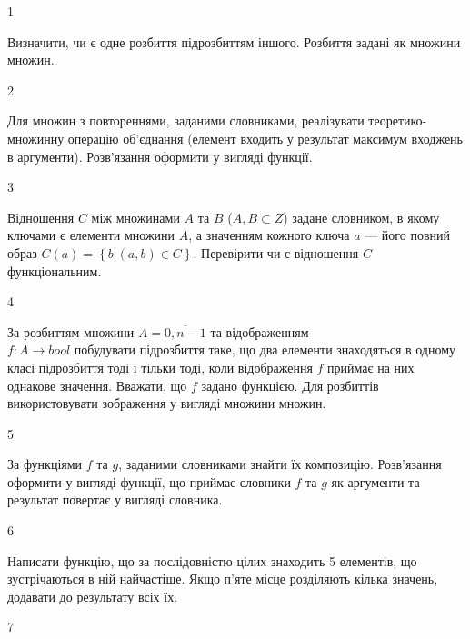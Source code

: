 1 

Визначити, чи є одне розбиття підрозбиттям іншого. Розбиття задані як множини множин.
\\\par
2 


Для множин з повтореннями, заданими словниками, реалізувати теоретико-множинну операцію об’єднання (елемент входить у результат максимум входжень в аргументи). Розв’язання оформити у вигляді функції.
\\\par
3 





Відношення $C$ між множинами $A$ та $B$ ($A, B\subset Z$) задане словником, в якому ключами є елементи множини $A$, а значенням кожного ключа $a$ --- його повний образ $C\left(a\right)=\left\{b|\left(a,b\right)\in C\right\}$. Перевірити чи є відношення $C$ функціональним.
\\\par
4 

За розбиттям множини $A=\overline{0,n-1}$ та відображенням\\ $f{:}A\rightarrow{bool}$  побудувати підрозбиття таке, що два елементи знаходяться в одному класі підрозбиття тоді і тільки тоді, коли відображення $f$ приймає на них однакове значення. Вважати, що $f$ задано функцією. Для розбиттів використовувати зображення у вигляді множини множин.
\\\par
5 














За функціями $f$ та $g$, заданими словниками знайти їх композицію. Розв’язання оформити у вигляді функції, що приймає словники $f$ та $g$ як аргументи та результат повертає у вигляді словника.
\\\par
6 














Написати функцію, що за послідовністю цілих знаходить 5 елементів, що зустрічаються в ній найчастіше. Якщо п’яте місце розділяють кілька значень, додавати до результату всіх їх.
\\\par
7 














